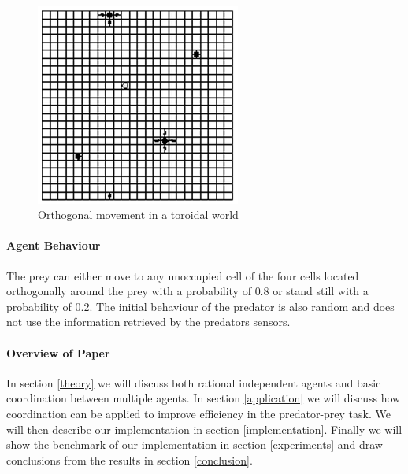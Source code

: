 \documentclass[10pt]{article}
\begin{document}
\begin{figure}[h!tb]
\centering
\includegraphics[width=0.6\textwidth]{img/toroidal}
\caption{Orthogonal movement in a toroidal world}
\label{fig_torwor}
\end{figure}

\paragraph{Agent Behaviour}
The prey can either move to any unoccupied cell of the four cells located orthogonally around the prey with a probability of $0.8$ or stand still with a probability of $0.2$. The initial behaviour of the predator is also random and does not use the information retrieved by the predators sensors.

\paragraph{Overview of Paper}
In section \ref{theory} we will discuss both rational independent agents and basic coordination between multiple agents. In section \ref{application} we will discuss how coordination can be applied to improve efficiency in the predator-prey task. We will then describe our implementation in section \ref{implementation}. Finally we will show the benchmark of our implementation in section \ref{experiments} and draw conclusions from the results in section \ref{conclusion}.
\end{document}
